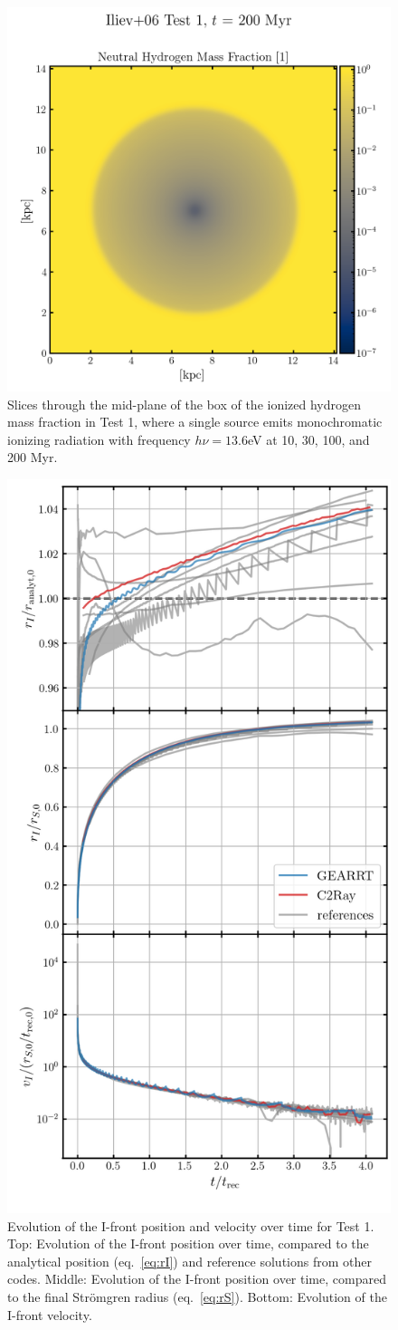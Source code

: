 \begin{figure}
 \includegraphics[width=.49\textwidth]{figures/RHD/Iliev1/output_0020-NoRef.png}%
 \caption{
Slices through the mid-plane of the box of the ionized hydrogen mass fraction in Test 1, where a
single source emits monochromatic ionizing radiation with frequency $h \nu = 13.6$eV at 10, 30, 100,
and 200 Myr.
 }
 \label{fig:iliev1-slices}
\end{figure}


\begin{figure}
 \centering
 \includegraphics[width=.7\textwidth]{figures/RHD/Iliev1/ionization_fronts.png}%
 \caption{
 Evolution of the I-front position and velocity over time for Test 1.
 Top: Evolution of the I-front position over time, compared to the analytical position
(eq.~\ref{eq:rI}) and reference solutions from other codes.
 Middle: Evolution of the I-front position over time, compared to the final Str\"omgren radius
(eq.~\ref{eq:rS}).
 Bottom: Evolution of the I-front velocity.
 }
 \label{fig:iliev1-Ifront}
\end{figure}


